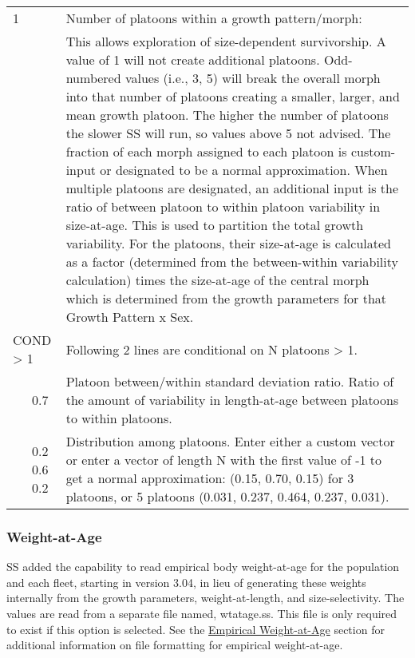 \begin{center}
\begin{longtable}{p{0.5cm} p{2cm} p{12cm}}
		\hline
		1 & & Number of platoons within a growth pattern/morph:\Tstrut\\
		& & This allows exploration of size-dependent survivorship. A value of 1 will not create additional platoons.  Odd-numbered values (i.e., 3, 5) will break the overall morph into that number of platoons creating a smaller, larger, and mean growth platoon.  The higher the number of platoons the slower SS will run, so values above 5 not advised.  The fraction of each morph assigned to each platoon is custom-input or designated to be a normal approximation.  When multiple platoons are designated, an additional input is the ratio of between platoon to within platoon variability in size-at-age.  This is used to partition the total growth variability.  For the platoons, their size-at-age is calculated as a factor (determined from the between-within variability calculation) times the size-at-age of the central morph which is determined from the growth parameters for that Growth Pattern x Sex. \Bstrut\\

		\multicolumn{2}{l}{COND > 1}& \multicolumn{1}{l}{\parbox{12cm}{Following 2 lines are conditional on N platoons > 1.}} \Tstrut\Bstrut\\

		& 0.7 & Platoon between/within standard deviation ratio. Ratio of the amount of variability in length-at-age between platoons to within platoons.\Bstrut\\

		& 0.2 0.6 0.2 & Distribution among platoons. Enter either a custom vector or enter a vector of length N with the first value of -1 to get a normal approximation: (0.15, 0.70, 0.15) for 3 platoons, or 5 platoons (0.031, 0.237, 0.464, 0.237, 0.031).\Bstrut\\
		\hline
	\end{longtable}
\end{center}

\subsubsection{Weight-at-Age}
SS added the capability to read empirical body weight-at-age for the population and each fleet, starting in version 3.04, in lieu of generating these weights internally from the growth parameters, weight-at-length, and size-selectivity. The values are read from a separate file named, wtatage.ss. This file is only required to exist if this option is selected.  See the \hyperlink{WAA}{Empirical Weight-at-Age} section for additional information on file formatting for empirical weight-at-age.

